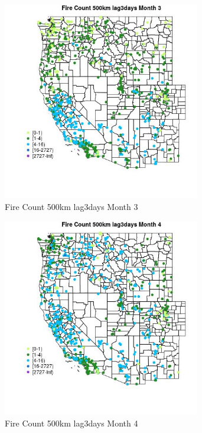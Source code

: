 \begin{figure} 
\centering  
\includegraphics[width=0.77\textwidth]{Code_Outputs/Report_ML_input_PM25_Step4_part_f_de_duplicated_aves_prioritize_24hr_obswNAs_MapObsMo3Fire_Count_500km_lag3days.jpg} 
\caption{\label{fig:Report_ML_input_PM25_Step4_part_f_de_duplicated_aves_prioritize_24hr_obswNAsMapObsMo3Fire_Count_500km_lag3days}Fire Count 500km lag3days Month 3} 
\end{figure} 
 

\begin{figure} 
\centering  
\includegraphics[width=0.77\textwidth]{Code_Outputs/Report_ML_input_PM25_Step4_part_f_de_duplicated_aves_prioritize_24hr_obswNAs_MapObsMo4Fire_Count_500km_lag3days.jpg} 
\caption{\label{fig:Report_ML_input_PM25_Step4_part_f_de_duplicated_aves_prioritize_24hr_obswNAsMapObsMo4Fire_Count_500km_lag3days}Fire Count 500km lag3days Month 4} 
\end{figure} 
 

